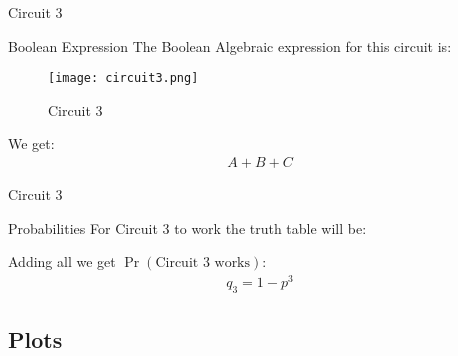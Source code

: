 \documentclass{beamer}
\providecommand{\pr}[1]{\ensuremath{\Pr\left(#1\right)}}
\begin{document}
\begin{frame}{Circuit 3}
\begin{block}{Boolean Expression}
    The Boolean Algebraic expression for this circuit is:
    \begin{figure}
        \centering
        \texttt{[image: circuit3.png]}
        \caption{Circuit 3}
        \label{cir3_label}
    \end{figure}
    We get:
    \begin{align}
        A + B + C
    \end{align}
\end{block}
    
\end{frame}
\begin{frame}{Circuit 3}
\begin{block}{Probabilities}
    For Circuit 3 to work the truth table will be:
    \begin{table}[h]
    \centering
    \caption{Circuit 3 working}
    \label{tab:table3}
\end{table}
    Adding all we get $\pr{\text{Circuit 3 works}}$:
    \begin{align}
    q_3 = 1-p^3 \label{q_3_label}
\end{align}
\end{block}
\end{frame}


\subsection{Plots}
\end{document}
